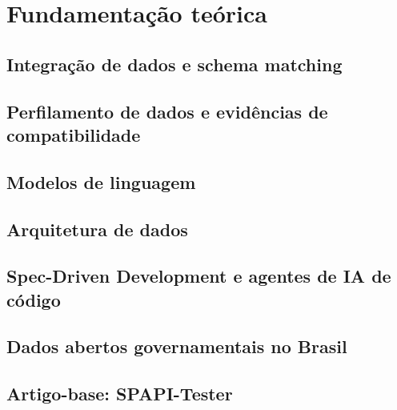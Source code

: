 \chapter{Fundamentação teórica}
\label{chap:fundamentacao}


\section{Integração de dados e schema matching}
\label{sec:fundamentacao-integracao-de-dados-e-schema-matching}

\section{Perfilamento de dados e evidências de compatibilidade}
\label{sec:fundamentacao-perfilamento-de-dados-e-evidencias-de-compatibilidade}

\section{Modelos de linguagem}
\label{sec:fundamentacao-modelos-de-linguagem}

\section{Arquitetura de dados}
\label{sec:fundamentacao-arquitetura-de-dados}

\section{Spec-Driven Development e agentes de IA de código}
\label{sec:fundamentacao-spec-driven-development-e-agentes-de-ia-de-codigo}

\section{Dados abertos governamentais no Brasil}
\label{sec:fundamentacao-dados-abertos-governamentais-no-brasil}

\section{Artigo-base: SPAPI-Tester}
\label{sec:fundamentacao-artigo-base-spapi-tester}
